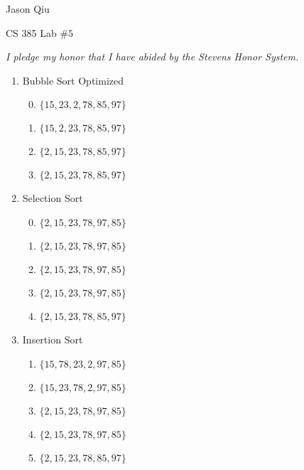 \documentclass[a4paper,10pt]{article}
\begin{document}
Jason Qiu

CS 385 Lab $\#5$

\emph{I pledge my honor that I have abided by the Stevens Honor System.}

\begin{enumerate}[1.]
\item Bubble Sort Optimized \begin{enumerate}[(1)]
	\setcounter{enumii}{-1}
	\item $\{15, 23, 2, 78, 85, 97\}$
	\item $\{15, 2, 23, 78, 85, 97\}$
	\item $\{2, 15, 23, 78, 85, 97\}$
	\item $\{2, 15, 23, 78, 85, 97\}$
\end{enumerate}
\item Selection Sort \begin{enumerate}[(1)]
	\setcounter{enumii}{-1}
	\item $\{2, 15, 23, 78, 97, 85\}$
	\item $\{2, 15, 23, 78, 97, 85\}$
	\item $\{2, 15, 23, 78, 97, 85\}$
	\item $\{2, 15, 23, 78, 97, 85\}$
	\item $\{2, 15, 23, 78, 85, 97\}$
\end{enumerate}
\item Insertion Sort \begin{enumerate}[(1)]
	\item $\{15, 78, 23, 2, 97, 85\}$
	\item $\{15, 23, 78, 2, 97, 85\}$
	\item $\{2, 15, 23, 78, 97, 85\}$
\item $\{2, 15, 23, 78, 97, 85\}$
	\item $\{2, 15, 23, 78, 85, 97\}$
\end{enumerate}
\end{enumerate}
\end{document}

